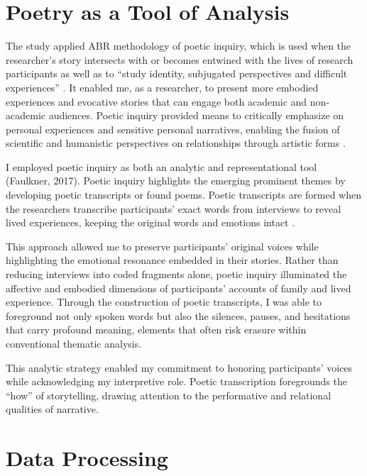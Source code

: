 \section{Poetry as a Tool of Analysis}

The study applied ABR methodology of poetic inquiry, which is used when the researcher's story intersects with or becomes entwined with the lives of research participants \citep{faulknerPoeticInquiryCraft2019} as well as to ``study identity, subjugated perspectives and difficult experiences'' \citep[p.~56]{faulknerExcavations2024}. It enabled me, as a researcher, to present more embodied experiences and evocative stories that can engage both academic and non-academic audiences. Poetic inquiry provided means to critically emphasize on personal experiences and sensitive personal narratives, enabling the fusion of scientific and humanistic perspectives on relationships through artistic forms \citep{ellingsonMakingDataQualitative2020, faulknerPoeticInquiryCraft2019, faulknerSettingAgendaPoetic2023, gioiachiltonArtsBasedResearchPractice2014}.

I employed poetic inquiry as both an analytic and representational tool (Faulkner, 2017). Poetic inquiry highlights the emerging prominent themes by developing poetic transcripts or found poems. Poetic transcripts are formed when the researchers transcribe participants' exact words from interviews to reveal lived experiences, keeping the original words and emotions intact \citep{faulknerPoeticInquiryCraft2019, faulknerSettingAgendaPoetic2023}.

This approach allowed me to preserve participants’ original voices while highlighting the emotional resonance embedded in their stories. Rather than reducing interviews into coded fragments alone, poetic inquiry illuminated the affective and embodied dimensions of participants’ accounts of family and lived experience. Through the construction of poetic transcripts, I was able to foreground not only spoken words but also the silences, pauses, and hesitations that carry profound meaning, elements that often risk erasure within conventional thematic analysis.

This analytic strategy enabled my commitment to honoring participants’ voices while acknowledging my interpretive role. Poetic transcription foregrounds the ``how'' of storytelling, drawing attention to the performative and relational qualities of narrative.

\section{Data Processing}

